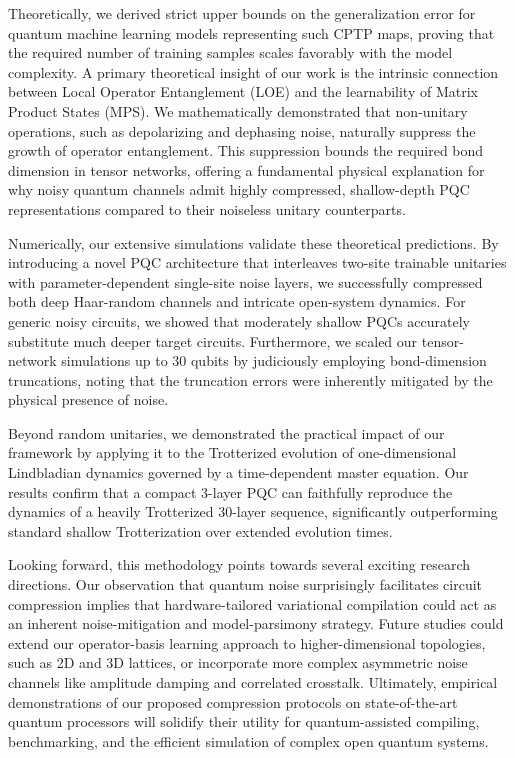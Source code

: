 \documentclass[%
 reprint,
superscriptaddress,
 amsmath,amssymb,
 aps,
]{revtex4-2}
\begin{document}
Theoretically, we derived strict upper bounds on the generalization error for quantum machine learning models representing such CPTP maps, proving that the required number of training samples scales favorably with the model complexity. A primary theoretical insight of our work is the intrinsic connection between Local Operator Entanglement (LOE) and the learnability of Matrix Product States (MPS). We mathematically demonstrated that non-unitary operations, such as depolarizing and dephasing noise, naturally suppress the growth of operator entanglement. This suppression bounds the required bond dimension in tensor networks, offering a fundamental physical explanation for why noisy quantum channels admit highly compressed, shallow-depth PQC representations compared to their noiseless unitary counterparts.

Numerically, our extensive simulations validate these theoretical predictions. By introducing a novel PQC architecture that interleaves two-site trainable unitaries with parameter-dependent single-site noise layers, we successfully compressed both deep Haar-random channels and intricate open-system dynamics. For generic noisy circuits, we showed that moderately shallow PQCs accurately substitute much deeper target circuits. Furthermore, we scaled our tensor-network simulations up to 30 qubits by judiciously employing bond-dimension truncations, noting that the truncation errors were inherently mitigated by the physical presence of noise. 

Beyond random unitaries, we demonstrated the practical impact of our framework by applying it to the Trotterized evolution of one-dimensional Lindbladian dynamics governed by a time-dependent master equation. Our results confirm that a compact 3-layer PQC can faithfully reproduce the dynamics of a heavily Trotterized 30-layer sequence, significantly outperforming standard shallow Trotterization over extended evolution times.

Looking forward, this methodology points towards several exciting research directions. Our observation that quantum noise surprisingly facilitates circuit compression implies that hardware-tailored variational compilation could act as an inherent noise-mitigation and model-parsimony strategy. Future studies could extend our operator-basis learning approach to higher-dimensional topologies, such as 2D and 3D lattices, or incorporate more complex asymmetric noise channels like amplitude damping and correlated crosstalk. Ultimately, empirical demonstrations of our proposed compression protocols on state-of-the-art quantum processors will solidify their utility for quantum-assisted compiling, benchmarking, and the efficient simulation of complex open quantum systems.


\end{document}
